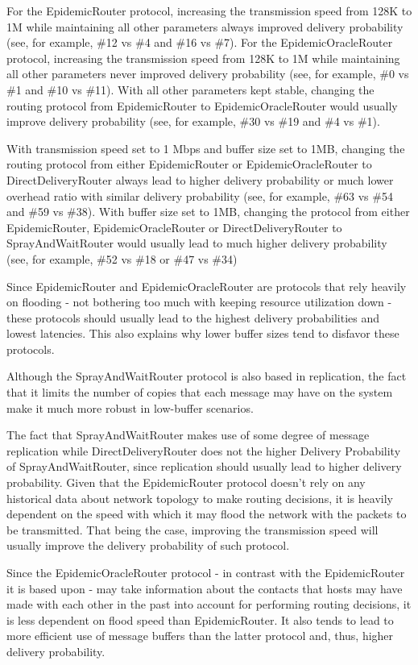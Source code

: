 For the EpidemicRouter protocol, increasing the transmission speed from 128K to
1M while maintaining all other parameters always improved delivery probability
(see, for example, \#12 vs \#4 and \#16 vs \#7).
For the EpidemicOracleRouter protocol, increasing the transmission speed from
128K to 1M while maintaining all other parameters never improved delivery
probability (see, for example, \#0 vs \#1 and \#10 vs \#11).
With all other parameters kept stable, changing the routing protocol from
EpidemicRouter to EpidemicOracleRouter would usually improve delivery
probability (see, for example, \#30 vs \#19 and \#4 vs \#1).

With transmission speed set to 1 Mbps and buffer size set to 1MB, changing the
routing protocol from either EpidemicRouter or EpidemicOracleRouter to
DirectDeliveryRouter always lead to higher delivery probability or much lower
overhead ratio with similar delivery probability (see, for example, \#63 vs
\#54 and \#59 vs \#38).
With buffer size set to 1MB, changing the protocol from either
EpidemicRouter, EpidemicOracleRouter or DirectDeliveryRouter to
SprayAndWaitRouter would usually lead to much higher delivery probability (see,
for example, \#52 vs \#18 or \#47 vs \#34)

Since EpidemicRouter and EpidemicOracleRouter are protocols that rely heavily
on flooding - not bothering too much with keeping resource utilization down -
these protocols should usually lead to the highest delivery probabilities and
lowest latencies. This also explains why lower
buffer sizes tend to disfavor these protocols.

Although the SprayAndWaitRouter protocol is also based in replication, the fact
that it limits the number of copies that each message may have on the system
make it much more robust in low-buffer scenarios.

The fact that SprayAndWaitRouter makes use of some degree of message
replication while DirectDeliveryRouter does not the higher Delivery Probability
of SprayAndWaitRouter, since replication should usually lead to higher delivery
probability.  Given that the EpidemicRouter protocol doesn't rely on any
historical data about network topology to make routing decisions, it is heavily
dependent on the speed with which it may flood the network with the packets to
be transmitted. That being the case, improving the transmission speed will
usually improve the delivery probability of such protocol.

Since the EpidemicOracleRouter protocol - in contrast with the EpidemicRouter
it is based upon - may take information about the contacts that hosts may have
made with each other in the past into account for performing routing decisions,
it is less dependent on flood speed than EpidemicRouter.
It also tends to lead to more efficient use of message buffers than the latter
protocol and, thus, higher delivery probability.
